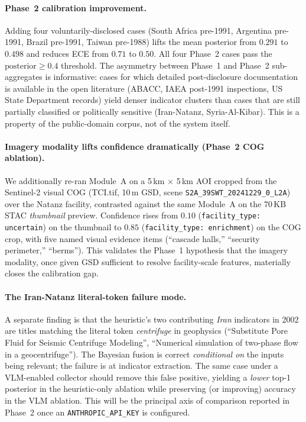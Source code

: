 \documentclass[11pt,a4paper]{article}
\begin{document}
\paragraph{Phase~2 calibration improvement.}
Adding four voluntarily-disclosed cases (South Africa pre-1991,
Argentina pre-1991, Brazil pre-1991, Taiwan pre-1988) lifts the
mean posterior from $0.291$ to $0.498$ and reduces ECE from $0.71$
to $0.50$. All four Phase~2 cases pass the $\text{posterior}
\geq 0.4$ threshold. The asymmetry between Phase~1 and Phase~2 sub-
aggregates is informative: cases for which detailed post-disclosure
documentation is available in the open literature (ABACC, IAEA
post-1991 inspections, US State Department records) yield denser
indicator clusters than cases that are still partially classified or
politically sensitive (Iran-Natanz, Syria-Al-Kibar). This is a
property of the public-domain corpus, not of the system itself.

\paragraph{Imagery modality lifts confidence dramatically (Phase~2 COG ablation).}
We additionally re-ran Module~A on a 5\,km $\times$ 5\,km AOI cropped
from the Sentinel-2 visual COG (TCI.tif, 10\,m GSD, scene
\texttt{S2A\_39SWT\_20241229\_0\_L2A}) over the Natanz facility,
contrasted against the same Module~A on the 70\,KB STAC \emph{thumbnail}
preview. Confidence rises from $0.10$ (\texttt{facility\_type:
uncertain}) on the thumbnail to $0.85$ (\texttt{facility\_type:
enrichment}) on the COG crop, with five named visual evidence items
(``cascade halls,'' ``security perimeter,'' ``berms''). This validates
the Phase~1 hypothesis that the imagery modality, once given GSD
sufficient to resolve facility-scale features, materially closes the
calibration gap.

\paragraph{The Iran-Natanz literal-token failure mode.}
A separate finding is that the heuristic's two contributing
\emph{Iran} indicators in 2002 are titles matching the literal token
\emph{centrifuge} in geophysics
(``Substitute Pore Fluid for Seismic Centrifuge Modeling'',
``Numerical simulation of two-phase flow in a geocentrifuge'').
The Bayesian fusion is correct \emph{conditional on} the inputs being
relevant; the failure is at indicator extraction. The same case under a
VLM-enabled collector should remove this false positive, yielding a
\emph{lower} top-1 posterior in the heuristic-only ablation while
preserving (or improving) accuracy in the VLM ablation. This will be
the principal axis of comparison reported in Phase~2 once an
\texttt{ANTHROPIC\_API\_KEY} is configured.
\end{document}
